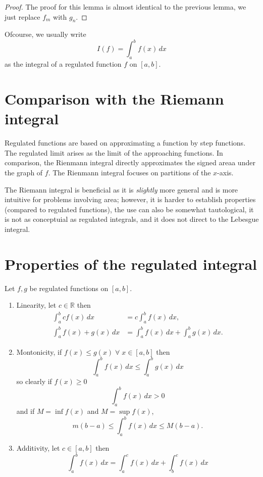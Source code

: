 \begin{proof}
    The proof for this lemma is almost identical to the previous lemma, we just replace $f_m$ with $g_n$.
\end{proof}

\begin{remark}
    Ofcourse, we usually write \[ I(f) = \int_a^b f(x) \, dx \] as the integral of a regulated function $f$ on $[a, b]$.
\end{remark}

\section{Comparison with the Riemann integral}

Regulated functions are based on approximating a function by step functions. The regulated limit arises as the limit of the approaching functions. In comparison, the Rienmann integral directly approximates the signed areaa under the graph of $f$. The Rienmann integral focuses on partitions of the $x$-axis.

The Riemann integral is beneficial as it is \emph{slightly} more general and is more intuitive for problems involving area; however, it is harder to establish properties (compared to regulated functions), the use can also be somewhat tautological, it is not as conceptuial as regulated integrals, and it does not direct to the Lebesgue integral. 

\section{Properties of the regulated integral}

\begin{theorem}
    Let $f, g$ be regulated functions on $[a, b]$.
    \begin{enumerate}
        \item Linearity, let $c \in \mathbb R$ then 
        \begin{align*}
            \int_a^b c f(x) \, dx &= c \int_a^b f(x) \, dx, \\
            \int_a^b f(x) + g(x) \, dx &= \int_a^b f(x) \, dx + \int_a^b g(x) \, dx.
        \end{align*}
        \item Montonicity, if $f(x) \leq g(x) \; \forall \; x \in [a, b]$ then \[ \int_a^b f(x) \, dx \leq \int_a^b g(x) \, dx \] so clearly if $f(x) \geq 0$ \[ \int_a^b f(x) \, dx > 0 \] and if $M = \inf{f(x)}$ and $M = \sup{f(x)}$, \[ m(b - a) \leq \int_a^b f(x) \, dx \leq M(b - a). \]
        \item Additivity, let $c \in [a, b]$ then \[ \int_a^b f(x) \, dx = \int_a^c f(x) \, dx + \int_b^c f(x) \, dx \]
    \end{enumerate}
\end{theorem}

